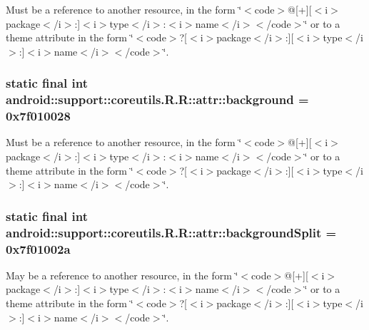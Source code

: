 Must be a reference to another resource, in the form \char`\"{}$<$code$>$@\mbox{[}+\mbox{]}\mbox{[}$<$i$>$package$<$/i$>$:\mbox{]}$<$i$>$type$<$/i$>$:$<$i$>$name$<$/i$>$$<$/code$>$\char`\"{} or to a theme attribute in the form \char`\"{}$<$code$>$?\mbox{[}$<$i$>$package$<$/i$>$:\mbox{]}\mbox{[}$<$i$>$type$<$/i$>$:\mbox{]}$<$i$>$name$<$/i$>$$<$/code$>$\char`\"{}. \hypertarget{classandroid_1_1support_1_1coreutils_1_1_r_1_1attr_1a64bfbd5eedd36852a8231a27ec7706}{
\subsubsection[{background}]{\setlength{\rightskip}{0pt plus 5cm}static final int android::support::coreutils.R.R::attr::background = 0x7f010028}}
\label{classandroid_1_1support_1_1coreutils_1_1_r_1_1attr_1a64bfbd5eedd36852a8231a27ec7706}


Must be a reference to another resource, in the form \char`\"{}$<$code$>$@\mbox{[}+\mbox{]}\mbox{[}$<$i$>$package$<$/i$>$:\mbox{]}$<$i$>$type$<$/i$>$:$<$i$>$name$<$/i$>$$<$/code$>$\char`\"{} or to a theme attribute in the form \char`\"{}$<$code$>$?\mbox{[}$<$i$>$package$<$/i$>$:\mbox{]}\mbox{[}$<$i$>$type$<$/i$>$:\mbox{]}$<$i$>$name$<$/i$>$$<$/code$>$\char`\"{}. \hypertarget{classandroid_1_1support_1_1coreutils_1_1_r_1_1attr_d4f5572dac68d20a7e967d6ce758ddc9}{
\subsubsection[{backgroundSplit}]{\setlength{\rightskip}{0pt plus 5cm}static final int android::support::coreutils.R.R::attr::backgroundSplit = 0x7f01002a}}
\label{classandroid_1_1support_1_1coreutils_1_1_r_1_1attr_d4f5572dac68d20a7e967d6ce758ddc9}


May be a reference to another resource, in the form \char`\"{}$<$code$>$@\mbox{[}+\mbox{]}\mbox{[}$<$i$>$package$<$/i$>$:\mbox{]}$<$i$>$type$<$/i$>$:$<$i$>$name$<$/i$>$$<$/code$>$\char`\"{} or to a theme attribute in the form \char`\"{}$<$code$>$?\mbox{[}$<$i$>$package$<$/i$>$:\mbox{]}\mbox{[}$<$i$>$type$<$/i$>$:\mbox{]}$<$i$>$name$<$/i$>$$<$/code$>$\char`\"{}. 

